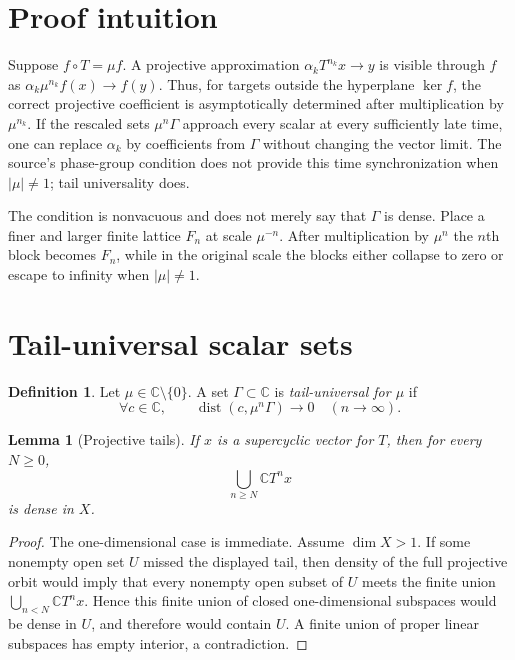 \documentclass[11pt]{article}
\newtheorem{lemma}[theorem]{Lemma}
\theoremstyle{definition}
\newtheorem{definition}[theorem]{Definition}
\newcommand{\C}{\mathbb C}
\newcommand{\dist}{\operatorname{dist}}
\begin{document}
\clearpage
\section{Proof intuition}

Suppose $f\circ T=\mu f$. A projective approximation
$\alpha_kT^{n_k}x\to y$ is visible through $f$ as
$\alpha_k\mu^{n_k}f(x)\to f(y)$. Thus, for targets outside the
hyperplane $\ker f$, the correct projective coefficient is asymptotically
determined after multiplication by $\mu^{n_k}$. If the rescaled sets
$\mu^n\Gamma$ approach every scalar at every sufficiently late time,
one can replace $\alpha_k$ by coefficients from $\Gamma$ without changing
the vector limit. The source's phase-group condition does not provide this
time synchronization when $|\mu|\ne1$; tail universality does.

The condition is nonvacuous and does not merely say that $\Gamma$ is dense.
Place a finer and larger finite lattice $F_n$ at scale $\mu^{-n}$.
After multiplication by $\mu^n$ the $n$th block becomes $F_n$, while in
the original scale the blocks either collapse to zero or escape to infinity
when $|\mu|\ne1$.

\section{Tail-universal scalar sets}

\begin{definition}
Let $\mu\in\C\setminus\{0\}$. A set $\Gamma\subset\C$ is
\emph{tail-universal for $\mu$} if
\begin{equation}\label{eq:tail}
  \forall c\in\C,\qquad \dist(c,\mu^n\Gamma)\longrightarrow0
  \quad(n\to\infty).
\end{equation}
\end{definition}

\begin{lemma}[Projective tails]\label{lem:tails}
If $x$ is a supercyclic vector for $T$, then for every $N\geq0$,
\[
 \bigcup_{n\geq N}\C T^n x
\]
is dense in $X$.
\end{lemma}

\begin{proof}
The one-dimensional case is immediate. Assume $\dim X>1$. If some
nonempty open set $U$ missed the displayed tail, then density of the full
projective orbit would imply that every nonempty open subset of $U$ meets
the finite union $\bigcup_{n<N}\C T^n x$. Hence this finite union of closed
one-dimensional subspaces would be dense in $U$, and therefore would contain
$U$. A finite union of proper linear subspaces has empty interior, a
contradiction.
\end{proof}
\end{document}
